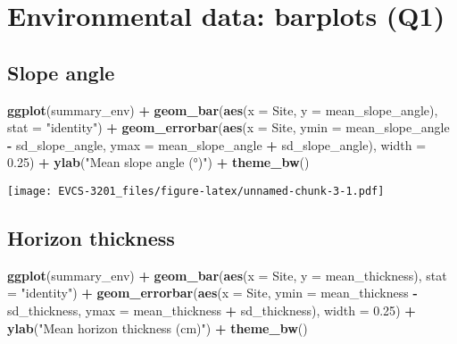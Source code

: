 \documentclass[]{book}
\newenvironment{Shaded}{\begin{snugshade}}{\end{snugshade}}
\newcommand{\KeywordTok}[1]{\textcolor[rgb]{0.13,0.29,0.53}{\textbf{#1}}}
\newcommand{\DataTypeTok}[1]{\textcolor[rgb]{0.13,0.29,0.53}{#1}}
\newcommand{\FloatTok}[1]{\textcolor[rgb]{0.00,0.00,0.81}{#1}}
\newcommand{\StringTok}[1]{\textcolor[rgb]{0.31,0.60,0.02}{#1}}
\newcommand{\OperatorTok}[1]{\textcolor[rgb]{0.81,0.36,0.00}{\textbf{#1}}}
\newcommand{\NormalTok}[1]{#1}
\begin{document}
\section{Environmental data: barplots
(Q1)}\label{environmental-data-barplots-q1}

\subsection*{Slope angle}\label{slope-angle}

\begin{Shaded}
\begin{Highlighting}[]
\KeywordTok{ggplot}\NormalTok{(summary_env) }\OperatorTok{+}
\StringTok{  }\KeywordTok{geom_bar}\NormalTok{(}\KeywordTok{aes}\NormalTok{(}\DataTypeTok{x =}\NormalTok{ Site, }\DataTypeTok{y =}\NormalTok{ mean_slope_angle), }\DataTypeTok{stat =} \StringTok{"identity"}\NormalTok{) }\OperatorTok{+}
\StringTok{  }\KeywordTok{geom_errorbar}\NormalTok{(}\KeywordTok{aes}\NormalTok{(}\DataTypeTok{x =}\NormalTok{ Site, }\DataTypeTok{ymin =}\NormalTok{ mean_slope_angle }\OperatorTok{-}\StringTok{ }\NormalTok{sd_slope_angle, }
                    \DataTypeTok{ymax =}\NormalTok{ mean_slope_angle }\OperatorTok{+}\StringTok{ }\NormalTok{sd_slope_angle),}
                \DataTypeTok{width =} \FloatTok{0.25}\NormalTok{) }\OperatorTok{+}
\StringTok{  }\KeywordTok{ylab}\NormalTok{(}\StringTok{"Mean slope angle (°)"}\NormalTok{) }\OperatorTok{+}
\StringTok{  }\KeywordTok{theme_bw}\NormalTok{()}
\end{Highlighting}
\end{Shaded}

\texttt{[image: EVCS-3201\_files/figure-latex/unnamed-chunk-3-1.pdf]}

\subsection*{Horizon thickness}\label{horizon-thickness}

\begin{Shaded}
\begin{Highlighting}[]
\KeywordTok{ggplot}\NormalTok{(summary_env) }\OperatorTok{+}
\StringTok{  }\KeywordTok{geom_bar}\NormalTok{(}\KeywordTok{aes}\NormalTok{(}\DataTypeTok{x =}\NormalTok{ Site, }\DataTypeTok{y =}\NormalTok{ mean_thickness), }\DataTypeTok{stat =} \StringTok{"identity"}\NormalTok{) }\OperatorTok{+}
\StringTok{  }\KeywordTok{geom_errorbar}\NormalTok{(}\KeywordTok{aes}\NormalTok{(}\DataTypeTok{x =}\NormalTok{ Site, }\DataTypeTok{ymin =}\NormalTok{ mean_thickness }\OperatorTok{-}\StringTok{ }\NormalTok{sd_thickness, }
                    \DataTypeTok{ymax =}\NormalTok{ mean_thickness }\OperatorTok{+}\StringTok{ }\NormalTok{sd_thickness),}
                \DataTypeTok{width =} \FloatTok{0.25}\NormalTok{) }\OperatorTok{+}
\StringTok{  }\KeywordTok{ylab}\NormalTok{(}\StringTok{"Mean horizon thickness (cm)"}\NormalTok{) }\OperatorTok{+}
\StringTok{  }\KeywordTok{theme_bw}\NormalTok{()}
\end{Highlighting}
\end{Shaded}
\end{document}
